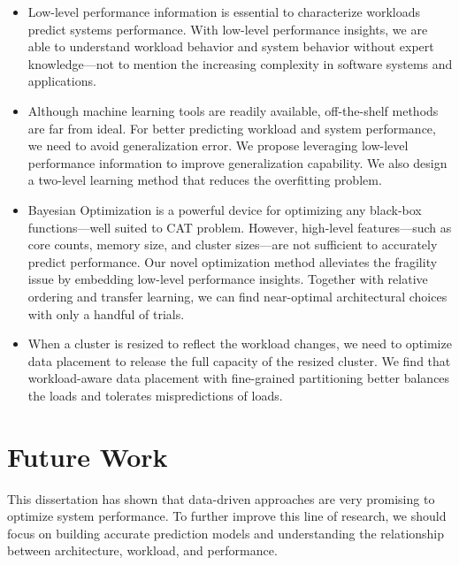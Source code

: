 \begin{itemize}

\item Low-level performance information is essential to
characterize workloads predict systems performance.
With low-level performance insights, we are able to understand
workload behavior and system behavior
without expert knowledge---not to mention the increasing complexity in
software systems and applications.

\item
Although machine learning tools are readily available,
off-the-shelf methods are far from ideal.
For better predicting workload and system performance,
we need to avoid generalization error.
We propose leveraging low-level performance information to
improve generalization capability.
We also design a two-level learning method that
reduces the overfitting problem.

\item
Bayesian Optimization is a powerful device
for optimizing any black-box functions---well suited to CAT problem.
However, high-level features---such as core counts, memory size,
and cluster sizes---are not sufficient to accurately predict performance.
Our novel optimization method alleviates the fragility issue
by embedding low-level performance insights.
Together with relative ordering and transfer learning, we can
find near-optimal architectural choices with only a handful of trials.

\item
When a cluster is resized to reflect the workload changes,
we need to optimize data placement to release the full capacity of
the resized cluster.
We find that workload-aware data placement with fine-grained partitioning
better balances the loads and tolerates mispredictions of loads.

\end{itemize}

\section{Future Work}

This dissertation has shown that data-driven approaches are very promising
to optimize system performance.
To further improve this line of research,
we should focus on building accurate prediction models and
understanding the relationship between architecture, workload, and performance.


